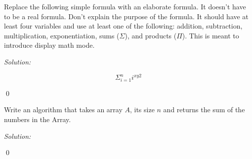 \documentclass[12pt]{article}
\newenvironment{problem}[2][Problem]{\begin{trivlist}
\item[\hskip \labelsep {\bfseries #1}\hskip \labelsep {\bfseries #2.}]}{\end{trivlist}}
\newenvironment{sol}
    {\emph{Solution:}
    }
    {
    \qed
    }
\begin{document}
\begin{problem}{4(1)} Replace the following simple formula with an elaborate
formula. It doesn't have to be a real formula. Don't explain the purpose
of the formula. It should have at least four variables and use at least
one of the following: addition, subtraction, multiplication, exponentiation,
sums ($\Sigma$), and products ($\Pi$). This is meant to introduce display
math mode.
\end{problem}
\begin{sol}
\[\Sigma_{i=1}^n i^{xy2}\]
\end{sol}


\begin{problem}{5(1)}
Write an algorithm that takes an array $A$, its size $n$ and returns the
sum of the numbers in the Array.

\begin{sol}
 \EndFor
 \EndProcedure
\end{sol}

\bigskip
\noindent

\end{problem}



\end{document}

